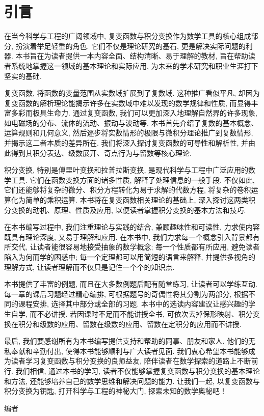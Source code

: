 
\chapter{引言}

在当今科学与工程的广阔领域中, 复变函数与积分变换作为数学工具的核心组成部分, 扮演着举足轻重的角色.
它们不仅是理论研究的基石, 更是解决实际问题的利器.
本书旨在为读者提供一本内容全面、结构清晰、易于理解的教材, 旨在帮助读者系统地掌握这一领域的基本理论和实际应用, 为未来的学术研究和职业生涯打下坚实的基础. 

复变函数, 将函数的变量范围从实数域扩展到了复数域.
这种推广看似平凡, 却因为复变函数的解析理论能揭示许多在实数域中难以发现的数学规律和性质, 而显得丰富多彩而极具生命力.
通过复变函数, 我们可以更加深入地理解自然界的许多现象, 如电磁场的分布、流体的流动、振动与波动等.
本书首先介绍了复数的基本概念、运算规则和几何意义, 然后逐步将实数情形的极限与微积分理论推广到复数情形, 并揭示这二者本质的差异所在.
我们将深入探讨复变函数的可导性和解析性, 并由此得到其积分表达、级数展开、奇点行为与留数等核心理论. 

积分变换, 特别是傅里叶变换和拉普拉斯变换, 是现代科学与工程中广泛应用的数学工具.
它们在函数变换方面的诸多性质, 解释了处理信息的一般手段.
不仅如此, 它们还能够将复杂的微分、积分方程转化为易于求解的代数方程, 将复杂的卷积运算化为简单的乘积运算.
本书将在复变函数相关理论的基础上, 深入探讨这两类积分变换的动机、原理、性质及应用, 以便读者掌握积分变换的基本方法和技巧.



在本书编写过程中, 我们注重理论与实践的结合, 兼顾趣味性和可读性, 力求使内容既具有理论深度, 又易于理解和应用.
在本书中, 我们力求每一个概念引入背景都有所交代, 让读者能很容易地接受抽象的数学概念;
每一个性质都有所应用, 避免读者陷入为何而学的困惑中;
每一个定理都可以用简短的语言来解释, 并提供多视角的理解方式, 让读者理解而不仅只是记住一个个的知识点.

本书提供了丰富的例题, 而且在大多数例题后配有随堂练习, 让读者可以学练互动.
每一章的课后习题经过精心编排, 可根据题号的奇偶性将其分割为两部分, 根据不同的课程安排, 选择其中部分或全部的习题.
本书中的选读内容建议让感兴趣的学生自学, 而不必讲授.
若因课时不足而不能讲授全书, 可依次去掉保形映射、积分变换在积分和级数的应用、留数在级数的应用、留数在定积分的应用而不讲授.

最后, 我们要感谢所有为本书编写提供支持和帮助的同事、朋友和家人. 他们的无私奉献和辛勤付出, 使得本书能够顺利与广大读者见面. 我们衷心希望本书能够成为读者学习复变函数与积分变换的良师益友, 陪伴读者在数学探索的道路上不断前行. 
我们相信, 通过本书的学习, 读者不仅能够掌握复变函数与积分变换的基本理论和方法, 还能够培养自己的数学思维和解决问题的能力.
让我们一起, 以复变函数与积分变换为钥匙, 打开科学与工程的神秘大门, 探索未知的数学奥秘吧！

\vskip 0.5cm
\begin{flushright}
编者

\zhtoday
\end{flushright}
